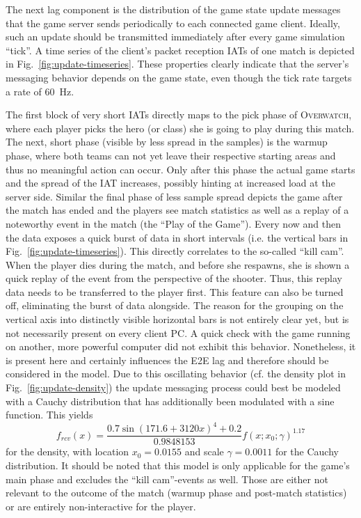	The next lag component is the distribution of the game state update messages that the game server sends periodically to each connected game client. Ideally, such an update should be transmitted immediately after every game simulation ``tick''. A time series of the client's packet reception \glspl{IAT} of one match is depicted in Fig.~\ref{fig:update-timeseries}. These properties clearly indicate that the server's messaging behavior depends on the game state, even though the tick rate targets a rate of \SI{60}{\hertz}. 

	The first block of very short \glspl{IAT} directly maps to the pick phase of \textsc{Overwatch}, where each player picks the hero (or class) she is going to play during this match. The next, short phase (visible by less spread in the samples) is the warmup phase, where both teams can not yet leave their respective starting areas and thus no meaningful action can occur. Only after this phase the actual game starts and the spread of the \gls{IAT} increases, possibly hinting at increased load at the server side. Similar the final phase of less sample spread depicts the game after the match has ended and the players see match statistics as well as a replay of a noteworthy event in the match (the ``Play of the Game''). Every now and then the data exposes a quick burst of data in short intervals (i.e. the vertical bars in Fig.~\ref{fig:update-timeseries}). This directly correlates to the so-called ``kill cam''. When the player dies during the match, and before she respawns, she is shown a quick replay of the event from the perspective of the shooter. Thus, this replay data needs to be transferred to the player first. This feature can also be turned off, eliminating the burst of data alongside.	The reason for the grouping on the vertical axis into distinctly visible horizontal bars is not entirely clear yet, but is not necessarily present on every client PC. A quick check with the game running on another, more powerful computer did not exhibit this behavior. Nonetheless, it is present here and certainly influences the \gls{E2E} lag and therefore should be considered in the model. Due to this oscillating behavior (cf. the density plot in Fig.~\ref{fig:update-density}) the update messaging process could best be modeled with a Cauchy distribution that has additionally been modulated with a sine function. This yields
	\begin{equation*}
		f_{rcv}(x) = \frac{0.7\sin(171.6 +3120x)^4 + 0.2}{0.9848153} f(x; x_0; \gamma)^{1.17} 
	\end{equation*}
	for the density, with location $x_0 = 0.0155$ and scale $\gamma = 0.0011$ for the Cauchy distribution. It should be noted that this model is only applicable for the game's main phase and excludes the ``kill cam''-events as well. Those are either not relevant to the outcome of the match (warmup phase and post-match statistics) or are entirely non-interactive for the player.



